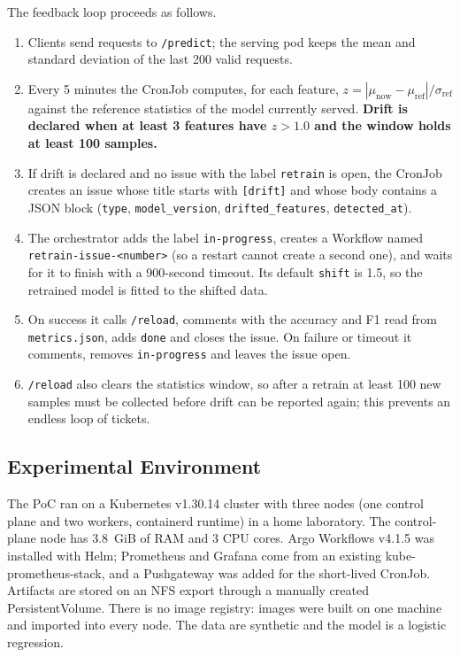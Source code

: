 The feedback loop proceeds as follows.
\begin{enumerate}
  \item Clients send requests to \texttt{/predict}; the serving pod keeps the mean and standard deviation of the last 200 valid requests.
  \item Every 5 minutes the CronJob computes, for each feature, $z = |\mu_{\text{now}} - \mu_{\text{ref}}| / \sigma_{\text{ref}}$ against the reference statistics of the model currently served. \textbf{Drift is declared when at least 3 features have $z > 1.0$ and the window holds at least 100 samples.}
  \item If drift is declared and no issue with the label \texttt{retrain} is open, the CronJob creates an issue whose title starts with \texttt{[drift]} and whose body contains a JSON block (\texttt{type}, \texttt{model\_version}, \texttt{drifted\_features}, \texttt{detected\_at}).
  \item The orchestrator adds the label \texttt{in-progress}, creates a Workflow named \texttt{retrain-issue-<number>} (so a restart cannot create a second one), and waits for it to finish with a 900-second timeout. Its default \texttt{shift} is 1.5, so the retrained model is fitted to the shifted data.
  \item On success it calls \texttt{/reload}, comments with the accuracy and F1 read from \texttt{metrics.json}, adds \texttt{done} and closes the issue. On failure or timeout it comments, removes \texttt{in-progress} and leaves the issue open.
  \item \texttt{/reload} also clears the statistics window, so after a retrain at least 100 new samples must be collected before drift can be reported again; this prevents an endless loop of tickets.
\end{enumerate}

\subsection{Experimental Environment}

The PoC ran on a Kubernetes v1.30.14 cluster with three nodes (one control plane and two workers, containerd runtime) in a home laboratory. The control-plane node has 3.8~GiB of RAM and 3 CPU cores. Argo Workflows v4.1.5 was installed with Helm; Prometheus and Grafana come from an existing kube-prometheus-stack, and a Pushgateway was added for the short-lived CronJob. Artifacts are stored on an NFS export through a manually created PersistentVolume. There is no image registry: images were built on one machine and imported into every node. The data are synthetic and the model is a logistic regression.

